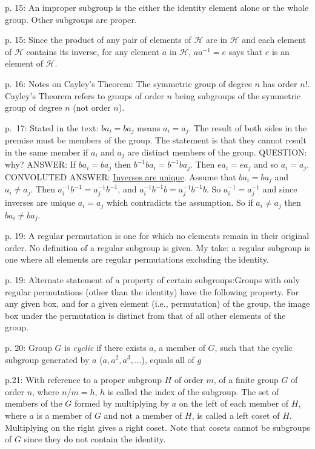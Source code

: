 p. 15: An improper subgroup is the either the identity element alone
or the whole group. Other subgroups are proper.

p. 15: Since the product of any pair of elements of $\mathcal H$ are
in $\mathcal H$ and each element of $\mathcal H$ contains its inverse,
for any element $a$ in $\mathcal H$, $aa^{-1} = e$ says that $e$ is an
element of $\mathcal H$.

p. 16: Notes on Cayley's Theorem: The symmetric group of degree $n$
has order $n!$. Cayley's Theorem refers to groups of order $n$ being
subgroups of the symmetric group of degree $n$ (not order $n$).

p.\ 17: Stated in the text: $ba_i = ba_j$ means $a_i = a_j$. The
result of both sides in the premise must be members of the group. The
statement is that they cannot result in the same member if $a_i$ and
$a_j$ are distinct members of the group. QUESTION: why? ANSWER: If
$ba_i = ba_j$ then $b^{-1}ba_i = b^{-1}ba_j$. Then $ea_i = ea_j$ and
so $a_i = a_j$. CONVOLUTED ANSWER:
\href{https://planetmath.org/uniquenessofinverseforgroups}{Inverses
  are unique}. Assume that $ba_i = ba_j$ and $a_i \neq a_j$. Then
$a^{-1}_i b^{-1} = a^{-1}_j b^{-1}$, and $a^{-1}_i b^{-1} b = a^{-1}_j
b^{-1} b$. So $a^{-1}_i = a^{-1}_j$ and since inverses are unique $a_i
= a_j$ which contradicts the assumption. So if $a_i \neq a_j$ then
$ba_i \neq ba_j$.

p. 19: A regular permutation is one for which no elements remain in
their original order. No definition of a regular subgroup is given. My
take: a regular subgroup is one where all elements are regular
permutations excluding the identity.

p. 19: Alternate statement of a property of certain
subgroups:\hfil\break Groups with only regular permutations (other
than the identity) have the following property. For any given box,
and for a given element (i.e., permutation) of the group, the image
box under the permutation is distinct from that of all other elements
of the group.

p. 20: Group $G$ is {\it cyclic} if there exists $a$, a member of $G$,
such that the cyclic subgroup generated by $a$ ($a,a^2,a^3,...$),
equals all of $g$

p.21: With reference to a proper subgroup $H$ of order $m$, of a
finite group $G$ of order $n$, where $n/m = h$, $h$ is called the
index of the subgroup. The set of members of the $G$ formed by
multiplying by $a$ on the left of each member of $H$, where $a$ is a
member of $G$ and not a member of $H$, is called a left coset of
$H$. Multiplying on the right gives a right coset. Note that cosets
cannot be subgroups of $G$ since they do not contain the identity.

